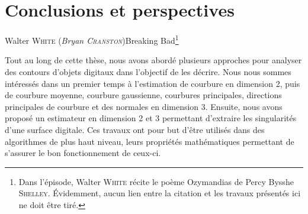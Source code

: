%
%
%
\chapter{Conclusions et perspectives}
\label{sec:conclusion}

 {Walter \textsc{White} (\emph{Bryan \textsc{Cranston}})}{Breaking
Bad}\footnote{Dans l'épisode, Walter \textsc{White} récite le poème Ozymandias
de Percy Bysshe \textsc{Shelley}. Évidemment, aucun lien entre la citation et
les travaux présentés ici ne doit être tiré.}

Tout au long de cette thèse, nous avons abordé plusieurs approches pour analyser
des contours d'objets digitaux dans l'objectif de les décrire. Nous nous sommes
intéressés dans un premier temps à l'estimation de courbure en dimension 2, puis
de courbure moyenne, courbure gaussienne, courbures
principales, directions principales de courbure et des normales en dimension
3. Ensuite, nous avons proposé un estimateur en dimension 2 et 3 permettant
d'extraire les singularités d'une surface digitale. Ces travaux ont pour but
d'être utilisés dans des algorithmes de plus haut niveau, leurs  propriétés
mathématiques permettant de s'assurer le bon fonctionnement de ceux-ci.

